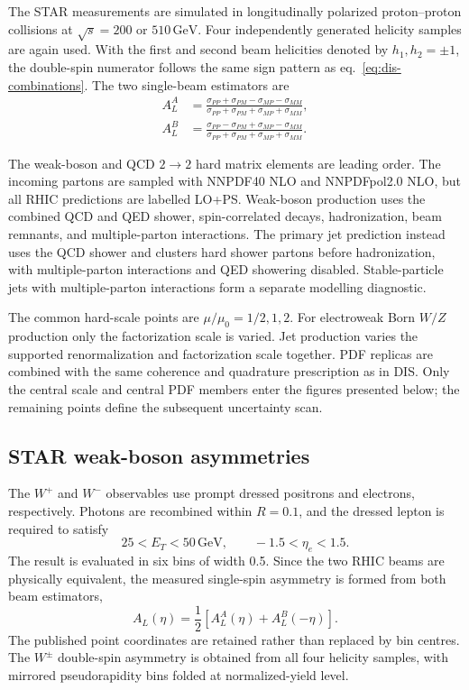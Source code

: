 \documentclass[11pt,a4paper]{article}
\newcommand{\GeV}{\ensuremath{\,\mathrm{GeV}}}
\begin{document}
The STAR measurements are simulated in longitudinally polarized
proton--proton collisions at $\sqrt{s}=200$ or $510\GeV$.  Four independently
generated helicity samples are again used.  With the first and second beam
helicities denoted by $h_1,h_2=\pm1$, the double-spin numerator follows the
same sign pattern as eq.~\eqref{eq:dis-combinations}.  The two single-beam
estimators are
\begin{align}
 A_L^A &=
 \frac{\sigma_{PP}+\sigma_{PM}-\sigma_{MP}-\sigma_{MM}}
      {\sigma_{PP}+\sigma_{PM}+\sigma_{MP}+\sigma_{MM}},\\
 A_L^B &=
 \frac{\sigma_{PP}-\sigma_{PM}+\sigma_{MP}-\sigma_{MM}}
      {\sigma_{PP}+\sigma_{PM}+\sigma_{MP}+\sigma_{MM}}.
 \label{eq:single-beam}
\end{align}

The weak-boson and QCD $2\to2$ hard matrix elements are leading order.  The
incoming partons are sampled with NNPDF40 NLO and NNPDFpol2.0 NLO, but all
RHIC predictions are labelled LO+PS.  Weak-boson production uses the combined
QCD and QED shower, spin-correlated decays, hadronization, beam remnants, and
multiple-parton interactions.  The primary jet prediction instead uses the
QCD shower and clusters hard shower partons before hadronization, with
multiple-parton interactions and QED showering disabled.  Stable-particle
jets with multiple-parton interactions form a separate modelling diagnostic.

The common hard-scale points are
$\mu/\mu_0=1/2,1,2$.  For electroweak Born $W/Z$ production only the
factorization scale is varied.  Jet production varies the supported
renormalization and factorization scale together.  PDF replicas are combined
with the same coherence and quadrature prescription as in DIS.  Only the
central scale and central PDF members enter the figures presented below; the
remaining points define the subsequent uncertainty scan.

\subsection{STAR weak-boson asymmetries}

The $W^+$ and $W^-$ observables use prompt dressed positrons and electrons,
respectively.  Photons are recombined within $R=0.1$, and the dressed lepton
is required to satisfy
\begin{equation}
  25<E_T<50\GeV,\qquad -1.5<\eta_e<1.5.
\end{equation}
The result is evaluated in six bins of width 0.5.  Since the two RHIC beams are
physically equivalent, the measured single-spin asymmetry is formed from both
beam estimators,
\begin{equation}
 A_L(\eta)=\frac{1}{2}\left[A_L^A(\eta)+A_L^B(-\eta)\right].
 \label{eq:star-symmetrization}
\end{equation}
The published point coordinates are retained rather than replaced by bin
centres.  The $W^\pm$ double-spin asymmetry is obtained from all four
helicity samples, with mirrored pseudorapidity bins folded at normalized-yield
level.
\end{document}
